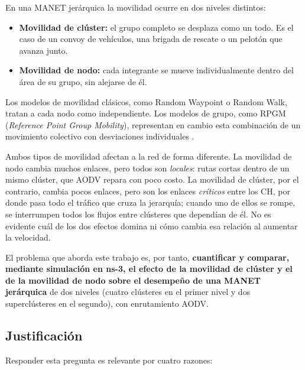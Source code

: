 En una MANET jerárquica la movilidad ocurre en dos niveles distintos:

\begin{itemize}
    \item \textbf{Movilidad de clúster:} el grupo completo se desplaza como un todo.
    Es el caso de un convoy de vehículos, una brigada de rescate o un pelotón que
    avanza junto.
    \item \textbf{Movilidad de nodo:} cada integrante se mueve individualmente dentro
    del área de su grupo, sin alejarse de él.
\end{itemize}

Los modelos de movilidad clásicos, como Random Waypoint o Random Walk, tratan a cada
nodo como independiente. Los modelos de grupo, como RPGM (\emph{Reference Point Group
Mobility}), representan en cambio esta combinación de un movimiento colectivo con
desviaciones individuales \cite{camp2002survey,hong1999group}.

Ambos tipos de movilidad afectan a la red de forma diferente. La movilidad de nodo
cambia muchos enlaces, pero todos son \emph{locales}: rutas cortas dentro de un mismo
clúster, que AODV repara con poco costo. La movilidad de clúster, por el contrario,
cambia pocos enlaces, pero son los enlaces \emph{críticos} entre los CH, por donde pasa
todo el tráfico que cruza la jerarquía; cuando uno de ellos se rompe, se interrumpen todos
los flujos entre clústeres que dependían de él. No es evidente cuál de los dos efectos domina ni
cómo cambia esa relación al aumentar la velocidad.

El problema que aborda este trabajo es, por tanto, \textbf{cuantificar y comparar,
mediante simulación en ns-3, el efecto de la movilidad de clúster y el de la movilidad de
nodo sobre el desempeño de una MANET jerárquica} de dos niveles (cuatro clústeres en el
primer nivel y dos superclústeres en el segundo), con enrutamiento AODV.

\subsection{Justificación}

Responder esta pregunta es relevante por cuatro razones:

